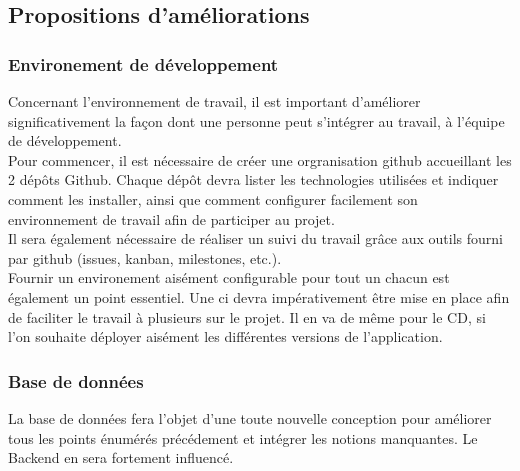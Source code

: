 \documentclass[
    iai, %
    il, %
]{heig-tb}
\begin{document}
\subsection{Propositions d'améliorations}

\subsubsection{Environement de développement}
Concernant l'environnement de travail, il est important d'améliorer significativement la façon dont
une personne peut s'intégrer au travail, à l'équipe de développement.\\
Pour commencer, il est nécessaire de créer une orgranisation \Gls{github} accueillant les 2 dépôts Github.
Chaque dépôt devra lister les technologies utilisées et indiquer comment les installer, ainsi que
comment configurer facilement son environnement de travail afin de participer au projet.\\
Il sera également nécessaire de réaliser un suivi du travail grâce aux outils fourni par \Gls{github} (issues, kanban, milestones, etc.).\\
Fournir un environement aisément configurable pour tout un chacun est également un point essentiel.
Une \Gls{ci} devra impérativement être mise en place afin de faciliter le travail à plusieurs sur le projet. Il en va de même pour le CD, si l'on souhaite déployer aisément les différentes versions de l'application.

\subsubsection{Base de données}
La base de données fera l'objet d'une toute nouvelle conception pour améliorer tous les points énumérés précédement et intégrer les notions manquantes. Le Backend en sera fortement influencé.
\end{document}
